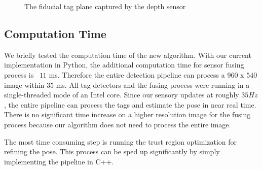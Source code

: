 \begin{figure}
\hfil
{}
\caption{The fiducial tag plane captured by the depth sensor}
\label{fig:exp_setup}
\end{figure}


\subsection{Computation Time}
We briefly tested the computation time of the new algorithm. With our current implementation in Python, the additional computation time for sensor fusing process is ~$11$ ms. Therefore the entire detection pipeline can process a $960$ x $540$ image within $35$ ms. All tag detectors and the fusing process were running in a single-threaded mode of an Intel core. Since our sensory updates at roughly $35Hz$, the entire pipeline can process the tags and estimate the pose in near real time. There is no significant time increase on a higher resolution image for the fusing process because our algorithm does not need to process the entire image.

The most time consuming step is running the trust region optimization for refining the pose. This process can be sped up significantly by simply implementing the pipeline in C++.